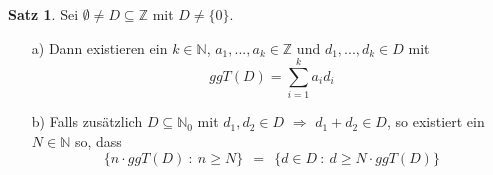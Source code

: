 \documentclass[a4paper,12pt]{scrartcl}
\theoremstyle{definition}
\newtheorem{sat}{Satz}[section]
\begin{document}
\begin{sat}
\label{Teiler als Linearkombi}
Sei $\emptyset \neq D \subseteq \mathbb{Z}$ mit $D \neq \lbrace 0 \rbrace$.
\begin{itemize}
\item[a)] Dann existieren ein $k \in \mathbb{N}$, $a_{1},...,a_{k} \in \mathbb{Z}$ und $d_{1},...,d_{k} \in D$ mit
\begin{equation*}
ggT(D) = \sum_{i=1}^{k} a_{i} d_{i}
\end{equation*} 
\item[b)] Falls zusätzlich $D \subseteq \mathbb{N}_{0}$ mit $d_{1},d_{2} \in D$ $\Rightarrow$ $d_{1} + d_{2} \in D$, so existiert ein $N \in \mathbb{N}$ so, dass
\begin{equation*}
\lbrace n \cdot ggT(D) \: : \: n \geq N \rbrace \: \: = \: \: \lbrace d \in D \: : \: d \geq N \cdot ggT(D) \rbrace
\end{equation*}
\end{itemize}
\end{sat}
\end{document}
